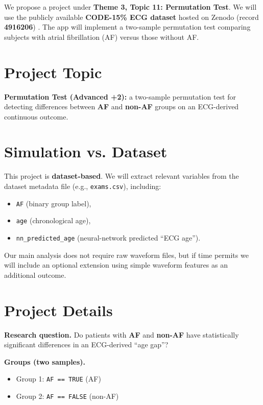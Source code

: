 \documentclass{article}
\begin{document}
    \begin{normalsize}
    We propose a project under \textbf{Theme 3, Topic 11: Permutation Test}. We will use the publicly available \textbf{CODE-15\% ECG dataset} 
    hosted on Zenodo (record \textbf{4916206}) \citep{code15_zenodo_4916206}. The app will implement a two-sample permutation test comparing subjects with atrial fibrillation (AF) versus those without AF.

	\section{Project Topic}
    \textbf{Permutation Test (Advanced +2):} a two-sample permutation test for detecting differences between \textbf{AF} and \textbf{non-AF} groups on an ECG-derived continuous outcome.

	\section{Simulation vs. Dataset}
    This project is \textbf{dataset-based}. We will extract relevant variables from the dataset metadata file (e.g., \texttt{exams.csv}), including:
    \begin{itemize}
        \item \texttt{AF} (binary group label),
        \item \texttt{age} (chronological age),
        \item \texttt{nn\_predicted\_age} (neural-network predicted ``ECG age'').
    \end{itemize}
    Our main analysis does not require raw waveform files, but if time permits we will include an optional extension using simple waveform features as an additional outcome.

	\section{Project Details}
    \textbf{Research question.} Do patients with \textbf{AF} and \textbf{non-AF} have statistically significant differences in an ECG-derived ``age gap''?

    \vspace{0.5em}
    \noindent \textbf{Groups (two samples).}
    \begin{itemize}
        \item Group 1: \texttt{AF == TRUE} (AF)
        \item Group 2: \texttt{AF == FALSE} (non-AF)
    \end{itemize}


\end{normalsize}
\end{document}
